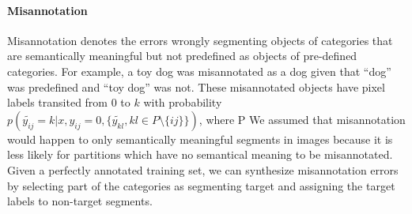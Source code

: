 %





\noindent
\paragraph{Misannotation}
Misannotation denotes the errors wrongly segmenting objects of categories that are semantically meaningful but not predefined as objects of pre-defined categories.
For example, a toy dog was misannotated as a dog given that ``dog'' was predefined and ``toy dog'' was not.
These misannotated objects have pixel labels transited from $0$ to $k$ with probability $p(\tilde{y_{ij}}=k \vert x, y_{ij}=0, \{\tilde{y_{kl}}, kl \in P \setminus \{ij\} \})$, where P
We assumed that misannotation would happen to only semantically meaningful segments in images because it is less likely for partitions which have no semantical meaning to be misannotated.
Given a perfectly annotated training set, we can synthesize misannotation errors by selecting part of the categories as segmenting target and assigning the target labels to non-target segments.


\noindent
